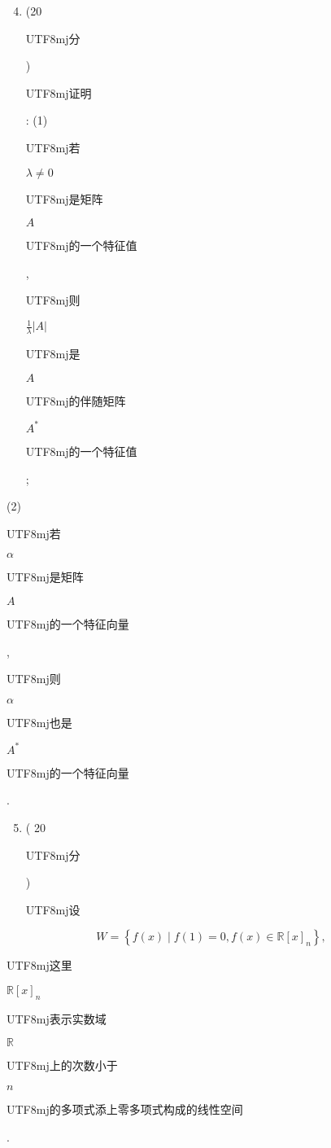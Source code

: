 \documentclass[10pt]{article}
\begin{document}
\begin{enumerate}
  \setcounter{enumi}{3}
  \item (20 \begin{CJK}{UTF8}{mj}分\end{CJK}) \begin{CJK}{UTF8}{mj}证明\end{CJK}: (1) \begin{CJK}{UTF8}{mj}若\end{CJK} $\lambda \neq 0$ \begin{CJK}{UTF8}{mj}是矩阵\end{CJK} $A$ \begin{CJK}{UTF8}{mj}的一个特征值\end{CJK}, \begin{CJK}{UTF8}{mj}则\end{CJK} $\frac{1}{\lambda}|A|$ \begin{CJK}{UTF8}{mj}是\end{CJK} $A$ \begin{CJK}{UTF8}{mj}的伴随矩阵\end{CJK} $A^{*}$ \begin{CJK}{UTF8}{mj}的一个特征值\end{CJK};
\end{enumerate}
(2) \begin{CJK}{UTF8}{mj}若\end{CJK} $\alpha$ \begin{CJK}{UTF8}{mj}是矩阵\end{CJK} $A$ \begin{CJK}{UTF8}{mj}的一个特征向量\end{CJK}, \begin{CJK}{UTF8}{mj}则\end{CJK} $\alpha$ \begin{CJK}{UTF8}{mj}也是\end{CJK} $A^{*}$ \begin{CJK}{UTF8}{mj}的一个特征向量\end{CJK}.

\begin{enumerate}
  \setcounter{enumi}{4}
  \item ( 20 \begin{CJK}{UTF8}{mj}分\end{CJK}) \begin{CJK}{UTF8}{mj}设\end{CJK}
\end{enumerate}
$$
W=\left\{f(x) \mid f(1)=0, f(x) \in \mathbb{R}[x]_{n}\right\},
$$
\begin{CJK}{UTF8}{mj}这里\end{CJK} $\mathbb{R}[x]_{n}$ \begin{CJK}{UTF8}{mj}表示实数域\end{CJK} $\mathbb{R}$ \begin{CJK}{UTF8}{mj}上的次数小于\end{CJK} $n$ \begin{CJK}{UTF8}{mj}的多项式添上零多项式构成的线性空间\end{CJK}.
\end{document}
